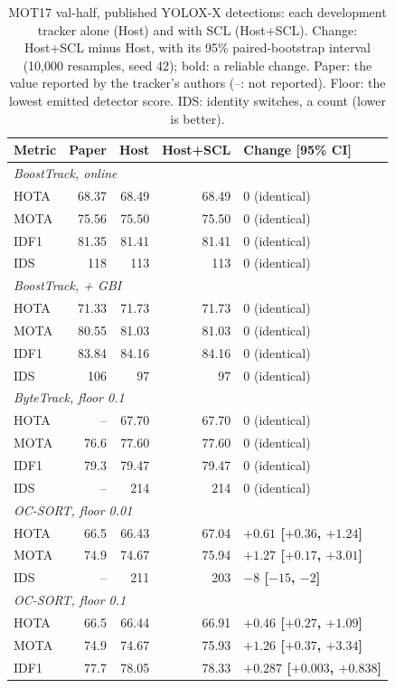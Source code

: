 \begin{table}[tbp]
\centering
\caption{MOT17 val-half, published YOLOX-X detections: each development tracker alone (Host) and with SCL (Host+SCL). Change: Host+SCL minus Host, with its 95\% paired-bootstrap interval (10,000 resamples, seed 42); bold: a reliable change. Paper: the value reported by the tracker's authors (--: not reported). Floor: the lowest emitted detector score. IDS: identity switches, a count (lower is better).}
\label{tab:scl-mot17}
\begin{tabular}{lrrrl}
\toprule
Metric & Paper & Host & Host+SCL & Change [95\% CI]\\
\midrule
\multicolumn{5}{l}{\textit{BoostTrack, online} \cite{stanojevic2024boosttrack}}\\
\quad HOTA & 68.37 & 68.49 & 68.49 & 0 (identical)\\
\quad MOTA & 75.56 & 75.50 & 75.50 & 0 (identical)\\
\quad IDF1 & 81.35 & 81.41 & 81.41 & 0 (identical)\\
\quad IDS & 118 & 113 & 113 & 0 (identical)\\
\multicolumn{5}{l}{\textit{BoostTrack, + GBI} \cite{stanojevic2024boosttrack}}\\
\quad HOTA & 71.33 & 71.73 & 71.73 & 0 (identical)\\
\quad MOTA & 80.55 & 81.03 & 81.03 & 0 (identical)\\
\quad IDF1 & 83.84 & 84.16 & 84.16 & 0 (identical)\\
\quad IDS & 106 & 97 & 97 & 0 (identical)\\
\multicolumn{5}{l}{\textit{ByteTrack, floor 0.1} \cite{zhang2022bytetrack}}\\
\quad HOTA & -- & 67.70 & 67.70 & 0 (identical)\\
\quad MOTA & 76.6 & 77.60 & 77.60 & 0 (identical)\\
\quad IDF1 & 79.3 & 79.47 & 79.47 & 0 (identical)\\
\quad IDS & -- & 214 & 214 & 0 (identical)\\
\multicolumn{5}{l}{\textit{OC-SORT, floor 0.01} \cite{cao2023ocsort}}\\
\quad HOTA & 66.5 & 66.43 & 67.04 & \textbf{$+0.61$ [$+0.36$, $+1.24$]}\\
\quad MOTA & 74.9 & 74.67 & 75.94 & \textbf{$+1.27$ [$+0.17$, $+3.01$]}\\
\quad IDS & -- & 211 & 203 & \textbf{$-8$ [$-15$, $-2$]}\\
\multicolumn{5}{l}{\textit{OC-SORT, floor 0.1} \cite{cao2023ocsort}}\\
\quad HOTA & 66.5 & 66.44 & 66.91 & \textbf{$+0.46$ [$+0.27$, $+1.09$]}\\
\quad MOTA & 74.9 & 74.67 & 75.93 & \textbf{$+1.26$ [$+0.37$, $+3.34$]}\\
\quad IDF1 & 77.7 & 78.05 & 78.33 & \textbf{$+0.287$ [$+0.003$, $+0.838$]}\\
\bottomrule
\end{tabular}
\end{table}

